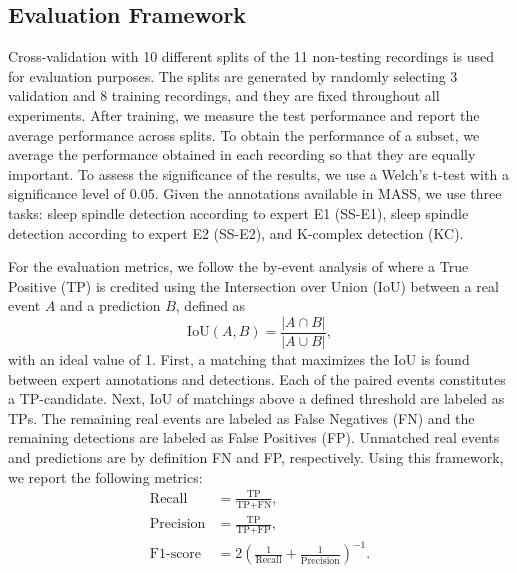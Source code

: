 \documentclass[conference]{IEEEtran}
\begin{document}
\subsection{Evaluation Framework}
\label{sec:eval}

Cross-validation with 10 different splits of the 11 non-testing recordings is used for evaluation purposes. The splits are generated by randomly selecting 3 validation and 8 training recordings, and they are fixed throughout all experiments. After training, we measure the test performance and report the average performance across splits. To obtain the performance of a subset, we average the performance obtained in each recording so that they are equally important. To assess the significance of the results, we use a Welch's t-test \cite{welch1947generalization} with a significance level of $0.05$. Given the annotations available in MASS, we use three tasks: sleep spindle detection according to expert E1 (SS-E1), sleep spindle detection according to expert E2 (SS-E2), and K-complex detection (KC).

For the evaluation metrics, we follow the by-event analysis of \cite{warby2014sleep} where a True Positive (TP) is credited using the Intersection over Union (IoU) between a real event $A$ and a prediction $B$, defined as
\begin{equation}
    \mathrm{IoU}(A,B)=\frac{|A\cap B|}{|A\cup B|},
    \label{eq:iou}
\end{equation}with an ideal value of 1. First, a matching that maximizes the IoU is found between expert annotations and detections. Each of the paired events constitutes a TP-candidate. Next, IoU of matchings above a defined threshold are labeled as TPs. The remaining real events are labeled as False Negatives (FN) and the remaining detections are labeled as False Positives (FP). Unmatched real events and predictions are by definition FN and FP, respectively. Using this framework, we report the following metrics:
\begin{align}
\text{Recall} &= \frac{\text{TP}}{\text{TP}+\text{FN}}\label{eq:recall},\\
\text{Precision} &= \frac{\text{TP}}{\text{TP}+\text{FP}}\label{eq:precision},\\
\text{F1-score} &= 2\left(\frac{1}{\text{Recall}}+\frac{1}{\text{Precision}}\right)^{-1}.\label{eq:f1_score}
\end{align}
\end{document}
